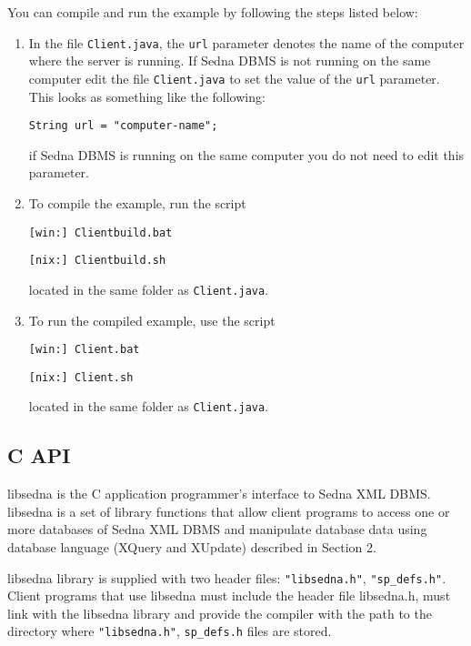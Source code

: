 \documentclass[a4paper,12pt]{article}
\begin{document}
You can compile and run the example by following the steps listed below:
\begin{enumerate}
\item In the file \verb!Client.java!, the \verb!url! parameter denotes the
 name of the computer where the server is running. If Sedna DBMS is not running
 on the same computer edit the file \verb!Client.java! to set the value of the \verb!url!
 parameter.
 This looks as something like the following:
 \begin{verbatim}String url = "computer-name";\end{verbatim}

if Sedna DBMS is running on the same computer you do not need to edit this parameter.
\item To compile the example, run the script
 \begin{verbatim}[win:] Clientbuild.bat\end{verbatim}
 \begin{verbatim}[nix:] Clientbuild.sh\end{verbatim}
 located in the same folder as \verb!Client.java!.

\item  To run the compiled example, use the script
 \begin{verbatim}[win:] Client.bat\end{verbatim}
 \begin{verbatim}[nix:] Client.sh\end{verbatim}
 located in the same folder as \verb!Client.java!.

\end{enumerate}

%
%
\subsection{C API}
\label{c-api}
libsedna is the C application programmer's interface to Sedna XML DBMS. libsedna is a set of library functions that allow client programs to access one or more databases of Sedna XML DBMS
and manipulate database data using database language (XQuery and XUpdate) described in Section 2.

libsedna library is supplied with two header files: \verb!"libsedna.h"!, \verb!"sp_defs.h"!.
Client programs that use libsedna must include the header file libsedna.h, must link with the libsedna library and provide the compiler with the path to the
directory where \verb!"libsedna.h"!, \verb!sp_defs.h! files are stored.
\end{document}
